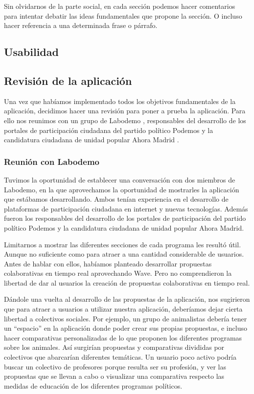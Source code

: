 Sin olvidarnos de la parte social, en cada sección podemos hacer comentarios para intentar debatir las ideas fundamentales que propone la sección. O incluso hacer referencia a una determinada frase o párrafo.
	\subsection{Usabilidad}
	
	\subsection{Revisión de la aplicación}
Una vez que habíamos implementado todos los objetivos fundamentales de la aplicación, decidimos hacer una revisión para poner a prueba la aplicación. Para ello nos reunimos con un grupo de Labodemo \cite{ref:labodemo}, responsables del desarrollo de los portales de participación ciudadana del partido político Podemos \cite{ref:podemos} y la candidatura ciudadana de unidad popular Ahora Madrid \cite{ref:ahoramadrid}.

	\subsubsection{Reunión con Labodemo}
Tuvimos la oportunidad de establecer una conversación con dos miembros de Labodemo, en la que aprovechamos la oportunidad de mostrarles la aplicación que estábamos desarrollando. Ambos tenían experiencia en el desarrollo de plataformas de participación ciudadana en internet y nuevas tecnologías. Además fueron los responsables del desarrollo de los portales de participación del partido político Podemos y la candidatura ciudadana de unidad popular Ahora Madrid.

Limitarnos a mostrar las diferentes secciones de cada programa les resultó útil. Aunque no suficiente como para atraer a una cantidad considerable de usuarios. Antes de hablar con ellos, habíamos planteado desarrollar propuestas colaborativas en tiempo real aprovechando Wave. Pero no comprendieron la libertad de dar al usuarios la creación de propuestas colaborativas en tiempo real.

Dándole una vuelta al desarrollo de las propuestas de la aplicación, nos sugirieron que para atraer a usuarios a utilizar nuestra aplicación, deberíamos dejar cierta libertad a colectivos sociales. Por ejemplo, un grupo de animalistas debería tener un “espacio” en la aplicación donde poder crear sus propias propuestas, e incluso hacer comparativas personalizadas de lo que proponen los diferentes programas sobre los animales. Así surgirían propuestas y comparativas divididas por colectivos que abarcarían diferentes temáticas. Un usuario poco activo podría buscar un colectivo de profesores porque resulta ser su profesión, y ver las propuestas que se llevan a cabo o visualizar una comparativa respecto las medidas de educación de los diferentes programas políticos.

